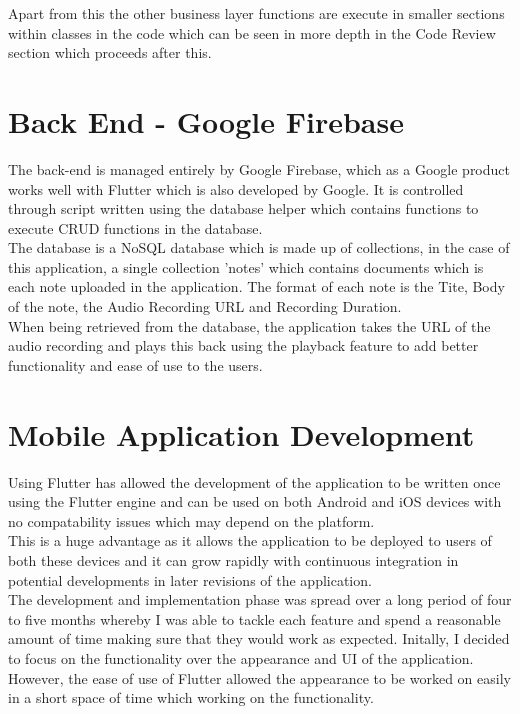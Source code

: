 \documentclass{report}
\begin{document}
	Apart from this the other business layer functions are execute in smaller sections within classes in the code which can be seen in more depth in the Code Review section which proceeds after this.

	\section{Back End - Google Firebase}
	The back-end is managed entirely by Google Firebase, which as a Google product works well with Flutter which is also developed by Google. It is controlled through script written using the database helper which contains functions to execute CRUD functions in the database.\\

The database is a NoSQL database which is made up of collections, in the case of this application, a single collection 'notes' which contains documents which is each note uploaded in the application. The format of each note is the Tite, Body of the note, the Audio Recording URL and Recording Duration.\\

When being retrieved from the database, the application takes the URL of the audio recording and plays this back using the playback feature to add better functionality and ease of use to the users.

	\section{Mobile Application Development}
	Using Flutter has allowed the development of the application to be written once using the Flutter engine and can be used on both Android and iOS devices with no compatability issues which may depend on the platform.\\

This is a huge advantage as it allows the application to be deployed to users of both these devices and it can grow rapidly with continuous integration in potential developments in later revisions of the application. \\

The development and implementation phase was spread over a long period of four to five months whereby I was able to tackle each feature and spend a reasonable amount of time making sure that they would work as expected. Initally, I decided to focus on the functionality over the appearance and UI of the application. However, the ease of use of Flutter allowed the appearance to be worked on easily in a short space of time which working on the functionality. \\
\end{document}

